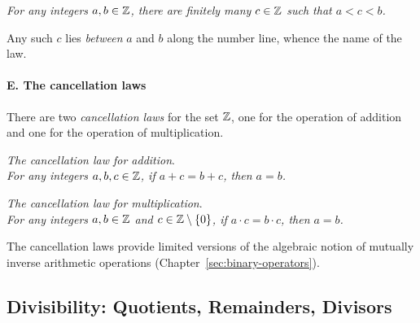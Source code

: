 \smallskip

\noindent
{\it For any integers $a, b \in \mathbb{Z}$, there are finitely many $c \in
  \mathbb{Z}$ such that $a < c < b$.}

\smallskip

\noindent
Any such $c$ lies {\em between} $a$ and $b$ along the number
line, whence the name of the law.

\paragraph{\small\sf E. The cancellation laws}

There are two {\it cancellation laws} for the set $\mathbb{Z}$,
 one for the operation of addition
and one for the operation of multiplication.

\medskip

\noindent
{\it The cancellation law for addition}. \\
%
{\it For any integers $a, b, c \in \mathbb{Z}$, if $a+c = b+c$, then $a = b$.}

\smallskip

\noindent
{\it The cancellation law for multiplication}. \\
%
{\it For any integers $a, b \in \mathbb{Z}$ and $c \in \mathbb{Z} \setminus \{0\}$, if
  $a \cdot c = b \cdot c$, then $a = b$.}

\smallskip

\noindent
The cancellation laws provide limited versions of the algebraic notion
of mutually inverse arithmetic operations
(Chapter~\ref{sec:binary-operators}).

\subsection{Divisibility: Quotients, Remainders, Divisors}
\label{sec:divisibility}


